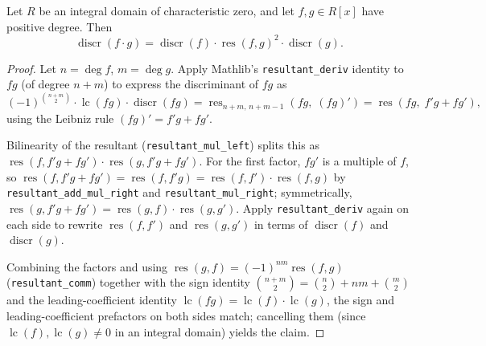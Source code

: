 \begin{theorem}
  \label{thm:discr_mul_eq}
  \leanok
  Let $R$ be an integral domain of characteristic zero, and let
  $f, g \in R[x]$ have positive degree.  Then
  \[
    \operatorname{discr}(f \cdot g)
      = \operatorname{discr}(f) \cdot \operatorname{res}(f, g)^2
        \cdot \operatorname{discr}(g).
  \]
\end{theorem}
\begin{proof}
  \leanok
  Let $n = \deg f$, $m = \deg g$.  Apply Mathlib's \texttt{resultant\_deriv}
  identity to $fg$ (of degree $n + m$) to express the discriminant of $fg$ as
  \[
    (-1)^{\binom{n+m}{2}} \cdot \operatorname{lc}(fg) \cdot \operatorname{discr}(fg)
      = \operatorname{res}_{n+m,\,n+m-1}(fg,\; (fg)')
      = \operatorname{res}(fg,\; f'g + fg'),
  \]
  using the Leibniz rule $(fg)' = f'g + fg'$.

  Bilinearity of the resultant (\texttt{resultant\_mul\_left}) splits this as
  $\operatorname{res}(f, f'g + fg') \cdot \operatorname{res}(g, f'g + fg')$.
  For the first factor, $fg'$ is a multiple of $f$, so
  $\operatorname{res}(f, f'g + fg') = \operatorname{res}(f, f'g)
  = \operatorname{res}(f, f') \cdot \operatorname{res}(f, g)$
  by \texttt{resultant\_add\_mul\_right} and \texttt{resultant\_mul\_right};
  symmetrically, $\operatorname{res}(g, f'g + fg')
  = \operatorname{res}(g, f) \cdot \operatorname{res}(g, g')$.  Apply
  \texttt{resultant\_deriv} again on each side to rewrite
  $\operatorname{res}(f, f')$ and $\operatorname{res}(g, g')$ in terms of
  $\operatorname{discr}(f)$ and $\operatorname{discr}(g)$.

  Combining the factors and using $\operatorname{res}(g, f)
  = (-1)^{nm} \operatorname{res}(f, g)$ (\texttt{resultant\_comm}) together
  with the sign identity $\binom{n+m}{2} = \binom{n}{2} + nm + \binom{m}{2}$
  and the leading-coefficient identity $\operatorname{lc}(fg)
  = \operatorname{lc}(f) \cdot \operatorname{lc}(g)$, the sign and
  leading-coefficient prefactors on both sides match; cancelling them
  (since $\operatorname{lc}(f), \operatorname{lc}(g) \neq 0$ in an integral
  domain) yields the claim.
\end{proof}

